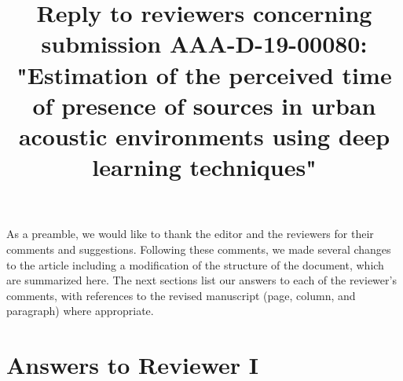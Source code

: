 \documentclass[10pt]{article}
\title{Reply to reviewers concerning submission AAA-D-19-00080: "Estimation of the perceived time of presence of sources in urban acoustic environments using deep learning techniques"}
\begin{document}
\maketitle

As a preamble, we would like to thank the editor and the reviewers for their comments and suggestions. Following these comments, we made several changes to the article including a modification of the structure of the document, which are summarized here. The next sections list our answers to each of the reviewer’s comments, with references to the revised manuscript (page, column, and paragraph) where appropriate.


\section{Answers to Reviewer I}
\end{document}
